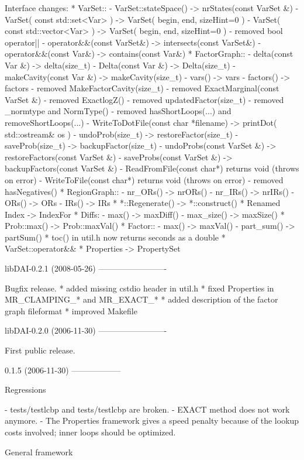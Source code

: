 \begin{DoxyVerbInclude}
Interface changes:
* VarSet::
  - VarSet::stateSpace() -> nrStates(const VarSet &)
  - VarSet( const std::set<Var> ) -> VarSet( begin, end, sizeHint=0 )
  - VarSet( const std::vector<Var> ) -> VarSet( begin, end, sizeHint=0 )
  - removed bool operator||
  - operator&&(const VarSet&) -> intersects(const VarSet&)
  - operator&&(const Var&) -> contains(const Var&)
* FactorGraph::
  - delta(const Var &) -> delta(size_t)
  - Delta(const Var &) -> Delta(size_t)
  - makeCavity(const Var &) -> makeCavity(size_t)
  - vars() -> vars
  - factors() -> factors
  - removed MakeFactorCavity(size_t)
  - removed ExactMarginal(const VarSet &)
  - removed ExactlogZ()
  - removed updatedFactor(size_t)
  - removed _normtype and NormType()
  - removed hasShortLoops(...) and removeShortLoops(...)
  - WriteToDotFile(const char *filename) -> printDot( std::ostream& os )
  - undoProb(size_t) -> restoreFactor(size_t)
  - saveProb(size_t) -> backupFactor(size_t)
  - undoProbs(const VarSet &) -> restoreFactors(const VarSet &)
  - saveProbs(const VarSet &) -> backupFactors(const VarSet &)
  - ReadFromFile(const char*) returns void (throws on error)
  - WriteToFile(const char*) returns void (throws on error)
  - removed hasNegatives()
* RegionGraph::
  - nr_ORs() -> nrORs()
  - nr_IRs() -> nrIRs()
  - ORs() -> ORs
  - IRs() -> IRs
* *::Regenerate() -> *::construct()
* Renamed Index -> IndexFor
* Diffs:
  - max() -> maxDiff()
  - max_size() -> maxSize()
* Prob::max() -> Prob::maxVal()
* Factor::
  - max() -> maxVal()
  - part_sum() -> partSum()
* toc() in util.h now returns seconds as a double
* VarSet::operator&&
* Properties -> PropertySet


libDAI-0.2.1 (2008-05-26)
-------------------------

Bugfix release.
* added missing cstdio header in util.h
* fixed Properties in MR_CLAMPING_* and MR_EXACT_*
* added description of the factor graph fileformat
* improved Makefile


libDAI-0.2.0 (2006-11-30)
-------------------------

First public release.


0.1.5 (2006-11-30)
------------------

Regressions

- tests/testlcbp and tests/testlcbp are broken.
- EXACT method does not work anymore.
- The Properties framework gives a speed penalty because of the lookup
  costs involved; inner loops should be optimized.

General framework


\end{DoxyVerbInclude}
